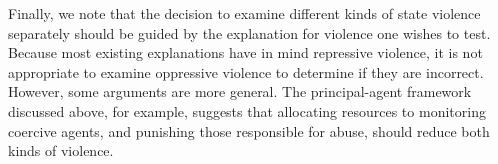 \documentclass[11pt]{article}
\begin{document}
Finally, we note that the decision to examine different kinds of state violence separately should be guided by the explanation for violence one wishes to test. Because most existing explanations have in mind repressive violence, it is not appropriate to examine oppressive violence to determine if they are incorrect. However, some arguments are more general. The principal-agent framework discussed above, for example, suggests that allocating resources to monitoring coercive agents, and punishing those responsible for abuse, should reduce both kinds of violence.   


\clearpage
\begin{singlespace}


\end{singlespace}
\end{document}
